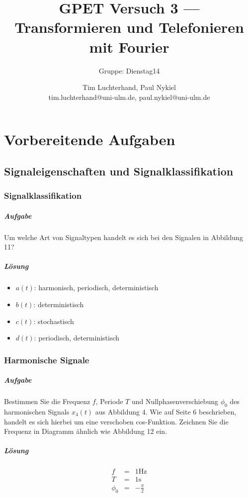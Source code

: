 \documentclass[10pt]{scrreprt}
\author{Tim Luchterhand, Paul Nykiel \protect\\ tim.luchterhand@uni-ulm.de, paul.nykiel@uni-ulm.de}
\title{GPET Versuch 3 --- Transformieren und Telefonieren mit Fourier}
\subtitle{Gruppe: Dienstag14}
\begin{document}
        \maketitle
        \chapter{Vorbereitende Aufgaben}
        \section{Signaleigenschaften und Signalklassifikation}
        \subsection{Signalklassifikation}
        \paragraph{Aufgabe}
        Um welche Art von Signaltypen handelt es sich bei den Signalen in Abbildung 11?

        \paragraph{Lösung}
        \begin{itemize}
            \item $a(t)$: harmonisch, periodisch, deterministisch
            \item $b(t)$: deterministisch
            \item $c(t)$: stochastisch
            \item $d(t)$: periodisch, deterministisch
        \end{itemize}

        \subsection{Harmonische Signale}
        \paragraph{Aufgabe}
        Bestimmen Sie die Frequenz $f$, Periode $T$ und Nullphasenverschiebung $\phi_0$ des harmonischen
        Signals $x_4(t)$ aus Abbildung 4. Wie auf Seite 6 beschrieben, handelt es sich hierbei
        um eine verschoben cos-Funktion. Zeichnen Sie die Frequenz in Diagramm ähnlich wie
        Abbildung 12 ein.

        \paragraph{Lösung}
        \begin{eqnarray*}
            f &=& 1\si{\hertz}\\
            T &=& 1\si{\second}\\
            \phi_0 &=& -\frac{\pi}{2}
        \end{eqnarray*}
\end{document}
